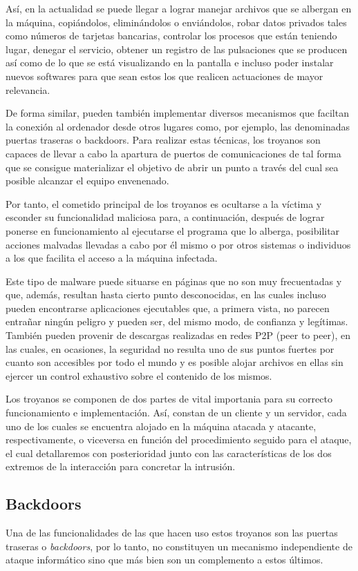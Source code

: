 		Así, en la actualidad se puede llegar a lograr manejar archivos que se albergan en la máquina, copiándolos, eliminándolos o enviándolos, robar datos privados tales como números de tarjetas bancarias, controlar los procesos que están teniendo lugar, denegar el servicio, obtener un registro de las pulsaciones que se producen así como de lo que se está visualizando en la pantalla e incluso poder instalar nuevos softwares para que sean estos los que realicen actuaciones de mayor relevancia.

		De forma similar, pueden también implementar diversos mecanismos que faciltan la conexión al ordenador desde otros lugares como, por ejemplo, las denominadas puertas traseras o backdoors. Para realizar estas técnicas, los troyanos son capaces de llevar a cabo la apartura de puertos de comunicaciones de tal forma que se consigue materializar el objetivo de abrir un punto a través del cual sea posible alcanzar el equipo envenenado.

		Por tanto, el cometido principal de los troyanos es ocultarse a la víctima y esconder su funcionalidad maliciosa para, a continuación, después de lograr ponerse en funcionamiento al ejecutarse el programa que lo alberga, posibilitar acciones malvadas llevadas a cabo por él mismo o por otros sistemas o individuos a los que facilita el acceso a la máquina infectada.

		Este tipo de malware puede situarse en páginas que no son muy frecuentadas y que, además, resultan hasta cierto punto desconocidas, en las cuales incluso pueden encontrarse aplicaciones ejecutables que, a primera vista, no parecen entrañar ningún peligro y pueden ser, del mismo modo, de confianza y legítimas. También pueden provenir de descargas realizadas en redes P2P (peer to peer), en las cuales, en ocasiones, la seguridad no resulta uno de sus puntos fuertes por cuanto son accesibles por todo el mundo y es posible alojar archivos en ellas sin ejercer un control exhaustivo sobre el contenido de los mismos.

		Los troyanos se componen de dos partes de vital importania para su correcto funcionamiento e implementación. Así, constan de un cliente y un servidor, cada uno de los cuales se encuentra alojado en la máquina atacada y atacante, respectivamente, o viceversa en función del procedimiento seguido para el ataque, el cual detallaremos con posterioridad junto con las características de los dos extremos de la interacción para concretar la intrusión.

	\subsection{Backdoors}
		Una de las funcionalidades de las que hacen uso estos troyanos son las puertas traseras o \textit{backdoors}, por lo tanto, no constituyen un mecanismo independiente de ataque informático sino que más bien son un complemento a estos últimos.

